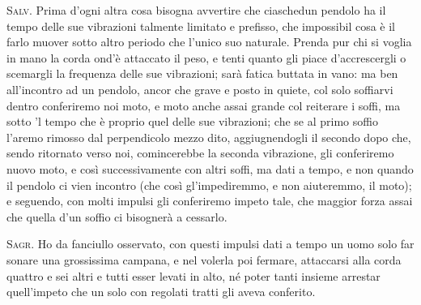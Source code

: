 \documentclass[11pt,twoside,openany]{book}
\newcommand{\speaker}[1]{\textcolor{rubric}{\textsc{#1}}\space}
\begin{document}
\speaker{Salv.} Prima d'ogni altra cosa bisogna avvertire che ciaschedun pendolo ha il tempo delle sue vibrazioni talmente limitato e prefisso, che impossibil cosa è il farlo muover sotto altro periodo che l'unico suo naturale. Prenda pur chi si voglia in mano la corda ond'è attaccato il peso, e tenti quanto gli piace d'accrescergli o scemargli la frequenza delle sue vibrazioni; sarà fatica buttata in vano: ma ben all'incontro ad un pendolo, ancor che grave e posto in quiete, col solo soffiarvi dentro conferiremo noi moto, e moto anche assai grande col reiterare i soffi, ma sotto 'l tempo che è proprio quel delle sue vibrazioni; che se al primo soffio l'aremo rimosso dal perpendicolo mezzo dito, aggiugnendogli il secondo dopo che, sendo ritornato verso noi, comincerebbe la seconda vibrazione, gli conferiremo nuovo moto, e così successivamente con altri soffi, ma dati a tempo, e non quando il pendolo ci vien incontro (che così gl'impediremmo, e non aiuteremmo, il moto); e seguendo, con molti impulsi gli conferiremo impeto tale, che maggior forza assai che quella d'un soffio ci bisognerà a cessarlo.

\speaker{Sagr.} Ho da fanciullo osservato, con questi impulsi dati a tempo un uomo solo far sonare una grossissima campana, e nel volerla poi fermare, attaccarsi alla corda quattro e sei altri e tutti esser levati in alto, né poter tanti insieme arrestar quell'impeto che un solo con regolati tratti gli aveva conferito.
\end{document}
